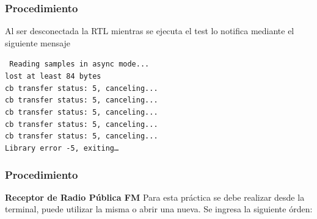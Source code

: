 \begin{frame}
\frametitle{Procedimiento}

Al ser desconectada la RTL mientras se ejecuta el test lo notifica mediante el siguiente mensaje 

\begin{block}{}
    \texttt{
    Reading samples in async mode... \\
    lost at least 84 bytes \\
    cb transfer status: 5, canceling... \\
    cb transfer status: 5, canceling... \\
    cb transfer status: 5, canceling... \\
    cb transfer status: 5, canceling... \\
    cb transfer status: 5, canceling... \\\vspace{2mm}
    Library error -5, exiting…\\}
\end{block}

\end{frame}

\begin{frame}
\frametitle{Procedimiento}

\textbf{Receptor de Radio Pública FM}
\vspace{2mm}
Para esta práctica se debe realizar desde la terminal, puede utilizar la misma o abrir una nueva. Se ingresa la siguiente órden:


\end{frame}

